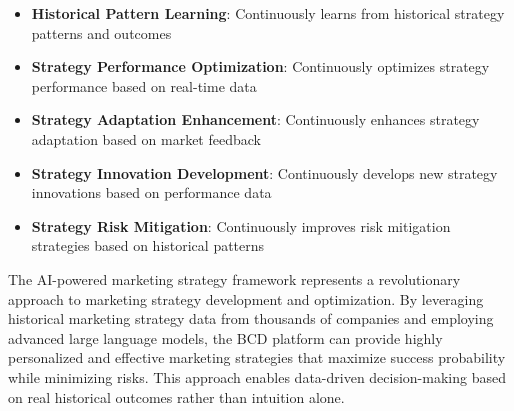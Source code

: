 \begin{itemize}
    \item \textbf{Historical Pattern Learning}: Continuously learns from historical strategy patterns and outcomes
    \item \textbf{Strategy Performance Optimization}: Continuously optimizes strategy performance based on real-time data
    \item \textbf{Strategy Adaptation Enhancement}: Continuously enhances strategy adaptation based on market feedback
    \item \textbf{Strategy Innovation Development}: Continuously develops new strategy innovations based on performance data
    \item \textbf{Strategy Risk Mitigation}: Continuously improves risk mitigation strategies based on historical patterns
\end{itemize}

The AI-powered marketing strategy framework represents a revolutionary approach to marketing strategy development and optimization. By leveraging historical marketing strategy data from thousands of companies and employing advanced large language models, the BCD platform can provide highly personalized and effective marketing strategies that maximize success probability while minimizing risks. This approach enables data-driven decision-making based on real historical outcomes rather than intuition alone. 